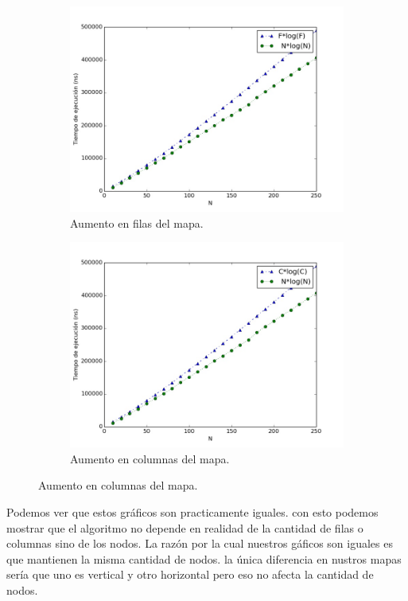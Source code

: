 \documentclass[spanish,12pt]{article}
\begin{document}
\begin{figure}[H]
    \centering
    \begin{subfigure}{0.45\textwidth}
        \includegraphics[width=\textwidth]{soloFilas}
        \caption{Aumento en filas del mapa.}
        \label{}
    \end{subfigure}
    \begin{subfigure}{0.45\textwidth}
        \includegraphics[width=\textwidth]{soloColumnas}
        \caption{Aumento en columnas del mapa.}
        \label{}
    \end{subfigure}
\end{figure}

Podemos ver que estos gráficos son practicamente iguales. con esto podemos mostrar que el algoritmo no depende en realidad de la cantidad de filas o columnas sino de los nodos. La razón por la cual nuestros gáficos son iguales es que mantienen la misma cantidad de nodos. la única diferencia en nustros mapas sería que uno es vertical y otro horizontal pero eso no afecta la cantidad de nodos.
\\
\\
\end{document}
